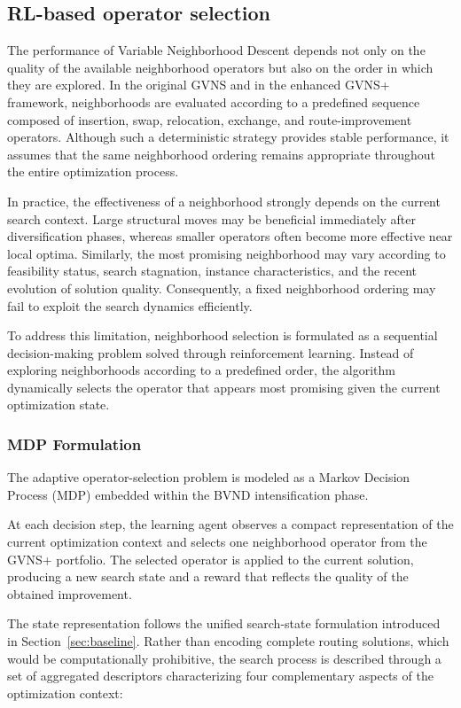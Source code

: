 \subsection{RL-based operator selection} 
The performance of Variable Neighborhood Descent depends not only on the quality of the available neighborhood operators but also on the order in which they are explored. In the original GVNS and in the enhanced GVNS+ framework, neighborhoods are evaluated according to a predefined sequence composed of insertion, swap, relocation, exchange, and route-improvement operators. Although such a deterministic strategy provides stable performance, it assumes that the same neighborhood ordering remains appropriate throughout the entire optimization process.

In practice, the effectiveness of a neighborhood strongly depends on the current search context. Large structural moves may be beneficial immediately after diversification phases, whereas smaller operators often become more effective near local optima. Similarly, the most promising neighborhood may vary according to feasibility status, search stagnation, instance characteristics, and the recent evolution of solution quality. Consequently, a fixed neighborhood ordering may fail to exploit the search dynamics efficiently.

To address this limitation, neighborhood selection is formulated as a sequential decision-making problem solved through reinforcement learning. Instead of exploring neighborhoods according to a predefined order, the algorithm dynamically selects the operator that appears most promising given the current optimization state.

\subsubsection{MDP Formulation}
The adaptive operator-selection problem is modeled as a Markov Decision Process (MDP) embedded within the BVND intensification phase.

At each decision step, the learning agent observes a compact representation of the current optimization context and selects one neighborhood operator from the GVNS+ portfolio. The selected operator is applied to the current solution, producing a new search state and a reward that reflects the quality of the obtained improvement.

The state representation follows the unified search-state formulation introduced in Section~\ref{sec:baseline}. Rather than encoding complete routing solutions, which would be computationally prohibitive, the search process is described through a set of aggregated descriptors characterizing four complementary aspects of the optimization context:

